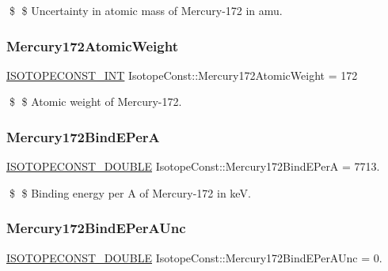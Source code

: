 \$ \$ Uncertainty in atomic mass of Mercury-\/172 in amu. \mbox{\label{group___isotope_const-_mercury-_hg172_ga72ad2bcf0be7705e3182775f33251ef7}} 
\subsubsection{\texorpdfstring{Mercury172\+Atomic\+Weight}{Mercury172AtomicWeight}}
{\footnotesize\ttfamily \mbox{\hyperlink{group___isotope_const-_macros_ga5f18360b3e99483a35c32d789e62621c}{I\+S\+O\+T\+O\+P\+E\+C\+O\+N\+S\+T\+\_\+\+I\+NT}} Isotope\+Const\+::\+Mercury172\+Atomic\+Weight = 172}

\$ \$ Atomic weight of Mercury-\/172. \mbox{\label{group___isotope_const-_mercury-_hg172_ga46b564d12de8c5022a01950feb5385b1}} 
\subsubsection{\texorpdfstring{Mercury172\+Bind\+E\+PerA}{Mercury172BindEPerA}}
{\footnotesize\ttfamily \mbox{\hyperlink{group___isotope_const-_macros_ga8f45a7272ce02c0b4c65c44636ed719a}{I\+S\+O\+T\+O\+P\+E\+C\+O\+N\+S\+T\+\_\+\+D\+O\+U\+B\+LE}} Isotope\+Const\+::\+Mercury172\+Bind\+E\+PerA = 7713.}

\$ \$ Binding energy per A of Mercury-\/172 in keV. \mbox{\label{group___isotope_const-_mercury-_hg172_ga5318e7dab8499e0851fccc93a4e713fe}} 
\subsubsection{\texorpdfstring{Mercury172\+Bind\+E\+Per\+A\+Unc}{Mercury172BindEPerAUnc}}
{\footnotesize\ttfamily \mbox{\hyperlink{group___isotope_const-_macros_ga8f45a7272ce02c0b4c65c44636ed719a}{I\+S\+O\+T\+O\+P\+E\+C\+O\+N\+S\+T\+\_\+\+D\+O\+U\+B\+LE}} Isotope\+Const\+::\+Mercury172\+Bind\+E\+Per\+A\+Unc = 0.}

